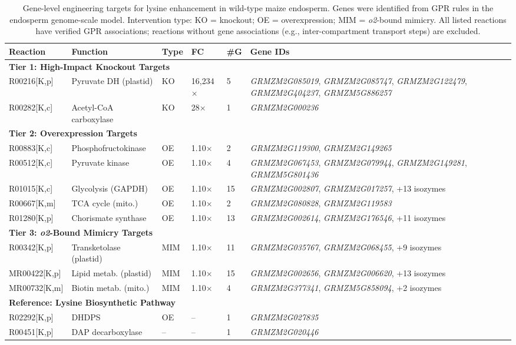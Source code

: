 \documentclass[11pt,letterpaper]{article}
\begin{document}
\begin{table}[H]
\centering
\caption{Gene-level engineering targets for lysine enhancement in wild-type maize endosperm. Genes were identified from GPR rules in the endosperm genome-scale model. Intervention type: KO = knockout; OE = overexpression; MIM = \textit{o2}-bound mimicry. All listed reactions have verified GPR associations; reactions without gene associations (e.g., inter-compartment transport steps) are excluded.}
\label{stab:gene_targets}
\small
\begin{tabular}{p{2.8cm}p{2.5cm}p{0.6cm}p{1.0cm}p{0.6cm}p{4.5cm}}
\toprule
Reaction & Function & Type & FC & \#G & Gene IDs \\
\midrule
\multicolumn{6}{l}{\textbf{Tier 1: High-Impact Knockout Targets}} \\
R00216[K,p] & Pyruvate DH (plastid) & KO & 16,234$\times$ & 5 & \textit{GRMZM2G085019}, \textit{GRMZM2G085747}, \textit{GRMZM2G122479}, \textit{GRMZM2G404237}, \textit{GRMZM5G886257} \\
R00282[K,c] & Acetyl-CoA carboxylase & KO & 28$\times$ & 1 & \textit{GRMZM2G000236} \\
\midrule
\multicolumn{6}{l}{\textbf{Tier 2: Overexpression Targets}} \\
R00883[K,c] & Phosphofructokinase & OE & 1.10$\times$ & 2 & \textit{GRMZM2G119300}, \textit{GRMZM2G149265} \\
R00512[K,c] & Pyruvate kinase & OE & 1.10$\times$ & 4 & \textit{GRMZM2G067453}, \textit{GRMZM2G079944}, \textit{GRMZM2G149281}, \textit{GRMZM5G801436} \\
R01015[K,c] & Glycolysis (GAPDH) & OE & 1.10$\times$ & 15 & \textit{GRMZM2G002807}, \textit{GRMZM2G017257}, +13 isozymes \\
R00667[K,m] & TCA cycle (mito.) & OE & 1.10$\times$ & 2 & \textit{GRMZM2G080828}, \textit{GRMZM2G119583} \\
R01280[K,p] & Chorismate synthase & OE & 1.10$\times$ & 13 & \textit{GRMZM2G002614}, \textit{GRMZM2G176546}, +11 isozymes \\
\midrule
\multicolumn{6}{l}{\textbf{Tier 3: \textit{o2}-Bound Mimicry Targets}} \\
R00342[K,p] & Transketolase (plastid) & MIM & 1.10$\times$ & 11 & \textit{GRMZM2G035767}, \textit{GRMZM2G068455}, +9 isozymes \\
MR00422[K,p] & Lipid metab. (plastid) & MIM & 1.10$\times$ & 15 & \textit{GRMZM2G002656}, \textit{GRMZM2G006620}, +13 isozymes \\
MR00732[K,m] & Biotin metab. (mito.) & MIM & 1.10$\times$ & 4 & \textit{GRMZM2G377341}, \textit{GRMZM5G858094}, +2 isozymes \\
\midrule
\multicolumn{6}{l}{\textbf{Reference: Lysine Biosynthetic Pathway}} \\
R02292[K,p] & DHDPS & OE & -- & 1 & \textit{GRMZM2G027835} \\
R00451[K,p] & DAP decarboxylase & -- & -- & 1 & \textit{GRMZM2G020446} \\
\bottomrule
\end{tabular}
\end{table}
\end{document}
